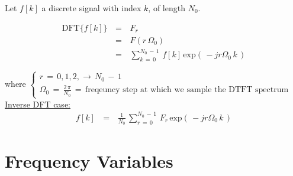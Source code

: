 \documentclass[12pt,a4paper]{book}
\begin{document}
Let $f[k]$ a discrete signal with index $k$, of length $N_0$.

\begin{equation}
\begin{array}{rcl}
\text{DFT}\{f[k]\} \, &=&\, F_r \\
						&=& \, F(r \, \Omega_0) \\
					   &=&\, \displaystyle\sum_{k \, = \, 0}^{N_0 \, - \, 1} \, f[k] \, \text{exp} \left(\, -j r \Omega_0 \, k   \,\right)
\end{array}
\label{Eq:DFT:dft_for_dtft}
\end{equation}
 
where $\begin{cases}
r \, = \, 0,1,2, \rightarrow \, N_0 \, - \, 1 \\
\Omega_0 \, = \,  \displaystyle\frac{2 \, \pi}{N_0} \, = \, \text{freqeuncy step at which we sample the DTFT spectrum}
\end{cases}$\\


\underline{Inverse DFT case:}\\

\begin{equation}
\begin{array}{rcl}
f[k] \, &=&\, \displaystyle\frac{1}{N_0} \, \displaystyle\sum_{r \, = \, 0}^{N_0 \, - \, 1} \, F_r \, \text{exp} \left(\, -j r \Omega_0 \, k   \,\right)
\end{array}
\end{equation}


\section{Frequency Variables}
\end{document}
